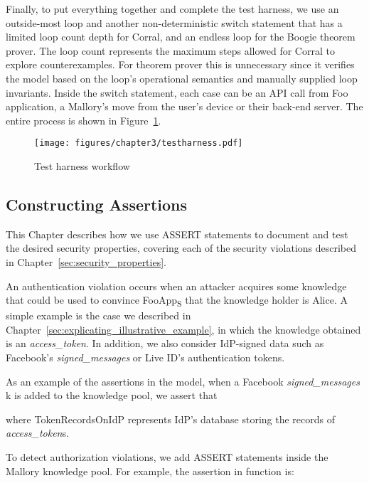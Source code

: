   Finally, to put everything together and complete the test harness, we use an outside-most loop and another non-deterministic switch statement that has a limited loop count depth for Corral, and an endless loop for the Boogie theorem prover.  The loop count represents the maximum steps allowed for Corral to explore counterexamples.  For theorem prover this is unnecessary since it verifies the model based on the loop's operational semantics and manually supplied loop invariants.  Inside the switch statement, each case can be an API call from Foo application, a Mallory's move from the user's device or their back-end server.  The entire process is shown in Figure~\ref{fig:testharness}.

\begin{figure}[hbt]
\centering
\texttt{[image: figures/chapter3/testharness.pdf]}
\caption{Test harness workflow}
\label{fig:testharness}
\end{figure}

\subsection{Constructing Assertions}
\label{explicating_constructing_assertions}
This Chapter describes how we use ASSERT statements to document and test the desired security properties, covering each of the security violations described in Chapter~\ref{sec:security_properties}. 

 An authentication violation occurs when an attacker acquires some knowledge that could be used to convince FooApp\textsubscript{S} that the knowledge holder is Alice.  A simple example is the case we described in Chapter~\ref{sec:explicating_illustrative_example}, in which the knowledge obtained is an \emph{access\_token}.  In addition, we also consider IdP-signed data such as Facebook's \emph{signed\_messages} or Live ID's authentication tokens.  

As an example of the assertions in the model, when a Facebook \emph{signed\_messages} k is added to the knowledge pool, we assert that


where TokenRecordsOnIdP represents IdP's database storing the records of \emph{access\_token}s.

 To detect authorization violations, we add ASSERT statements inside the Mallory knowledge pool.  For example, the assertion in function  is:

